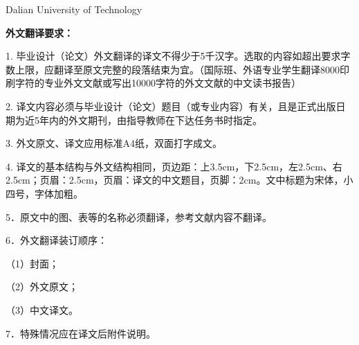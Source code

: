 
\linespread{1.25}
\thispagestyle{empty}
\begin{center}
Dalian University of Technology
\end{center}
{\song\sanhao\textbf {外文翻译要求：}}

\vspace{24pt}
1. 毕业设计（论文）外文翻译的译文不得少于5千汉字。选取的内容如超出要求字数上限，应翻译至原文完整的段落结束为宜。（国际班、外语专业学生翻译8000印刷字符的专业外文文献或写出10000字符的外文文献的中文读书报告）

2. 译文内容必须与毕业设计（论文）题目（或专业内容）有关，且是正式出版日期为近5年内的外文期刊，由指导教师在下达任务书时指定。

3. 外文原文、译文应用标准A4纸，双面打字成文。

4. 译文的基本结构与外文结构相同，页边距：上3.5cm，下2.5cm，左2.5cm、右2.5cm；页眉：2.5cm，页眉：译文的中文题目，页脚：2cm。文中标题为宋体，小四号，字体加粗。

5．原文中的图、表等的名称必须翻译，参考文献内容不翻译。

6．外文翻译装订顺序：

（1）封面；

（2）外文原文；

（3）中文译文。

7．特殊情况应在译文后附件说明。 
